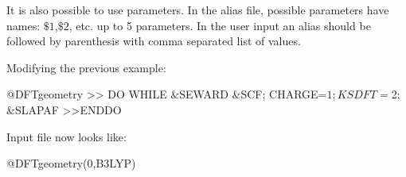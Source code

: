 It is also possible to use parameters. In the alias file, possible parameters
have names: $\$1$,$\$2$, etc. up to 5 parameters.
In the user input an alias should be followed by parenthesis with comma separated list
of values.

Modifying the previous example:
\begin{inputlisting}
  @DFTgeometry {
  >> DO WHILE
   &SEWARD
   &SCF; CHARGE=$1; KSDFT=$2;
   &SLAPAF
  >>ENDDO
  }
\end{inputlisting}
Input file now looks like:
\begin{inputlisting}
  @DFTgeometry(0,B3LYP)
\end{inputlisting}
